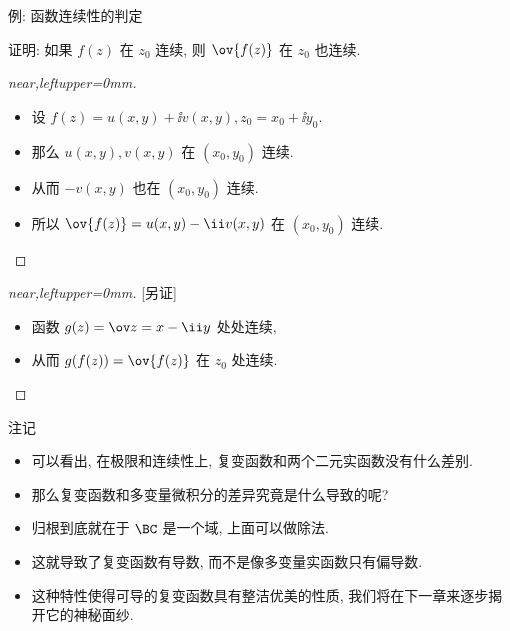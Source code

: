 \begin{frame}{例: 函数连续性的判定}
	\onslide<+->
	\begin{example}[near]
		证明: 如果 $f(z)$ 在 $z_0$ 连续, 则 $\ov{f(z)}$ 在 $z_0$ 也连续.
	\end{example}
	\onslide<+->
	\begin{proof}[near,leftupper=0mm]
		\begin{itemize}
			\item 设 $f(z)=u(x,y)+\ii v(x,y),z_0=x_0+\ii y_0$.
			\item 那么 $u(x,y),v(x,y)$ 在 $(x_0,y_0)$ 连续.
			\item 从而 $-v(x,y)$ 也在 $(x_0,y_0)$ 连续.
			\item 所以 $\ov{f(z)}=u(x,y)-\ii v(x,y)$ 在 $(x_0,y_0)$ 连续.\qedhere
		\end{itemize}
	\end{proof}
	\onslide<+->
	\begin{proof}[near,leftupper=0mm][另证]
		\begin{itemize}
			\item 函数 $g(z)=\ov z=x-\ii y$ 处处连续,
			\item 从而 $g(f(z))=\ov{f(z)}$ 在 $z_0$ 处连续.\qedhere
		\end{itemize}
	\end{proof}
\end{frame}


\begin{frame}{注记}
	\begin{itemize}
		\item 可以看出, 在极限和连续性上, 复变函数和两个二元实函数没有什么差别.
		\item 那么复变函数和多变量微积分的差异究竟是什么导致的呢?
		\item 归根到底就在于 $\BC$ 是一个域, 上面可以做除法.
		\item 这就导致了复变函数有\alert{导数}, 而不是像多变量实函数只有偏导数.
		\item 这种特性使得可导的复变函数具有整洁优美的性质, 我们将在下一章来逐步揭开它的神秘面纱.
	\end{itemize}
\end{frame}

